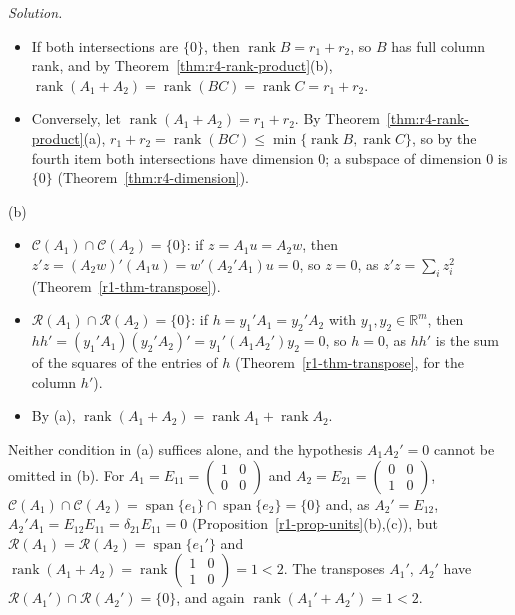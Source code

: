 \documentclass[12pt]{article}
\newcommand{\R}{\mathbb R}
\DeclareMathOperator{\rank}{rank}
\DeclareMathOperator{\Span}{span}
\theoremstyle{definition}
\newenvironment{solution}{\par\noindent\textit{Solution.}\ }{\par\smallskip}
\begin{document}
\begin{solution}
\begin{itemize}
\[
\rank B=r_1+r_2-\dim\bigl(\mathcal C(A_1)\cap\mathcal C(A_2)\bigr),\qquad
\rank C=r_1+r_2-\dim\bigl(\mathcal R(A_1)\cap\mathcal R(A_2)\bigr)
\]
\item If both intersections are \(\{0\}\), then \(\rank B=r_1+r_2\), so \(B\) has full column rank, and by
Theorem~\ref{thm:r4-rank-product}(b), \(\rank(A_1+A_2)=\rank(BC)=\rank C=r_1+r_2\).
\item Conversely, let \(\rank(A_1+A_2)=r_1+r_2\). By Theorem~\ref{thm:r4-rank-product}(a),
\(r_1+r_2=\rank(BC)\leqslant\min\{\rank B,\rank C\}\), so by the fourth item both intersections have dimension \(0\); a
subspace of dimension \(0\) is \(\{0\}\) (Theorem~\ref{thm:r4-dimension}).
\end{itemize}
(b)
\begin{itemize}
\item \(\mathcal C(A_1)\cap\mathcal C(A_2)=\{0\}\): if \(z=A_1u=A_2w\), then \(z'z=(A_2w)'(A_1u)=w'(A_2'A_1)u=0\), so
\(z=0\), as \(z'z=\sum_iz_i^2\) (Theorem~\ref{r1-thm-transpose}).
\item \(\mathcal R(A_1)\cap\mathcal R(A_2)=\{0\}\): if \(h=y_1'A_1=y_2'A_2\) with \(y_1,y_2\in\R^m\), then
\(hh'=(y_1'A_1)(y_2'A_2)'=y_1'(A_1A_2')y_2=0\), so \(h=0\), as \(hh'\) is the sum of the squares of the entries of
\(h\) (Theorem~\ref{r1-thm-transpose}, for the column \(h'\)).
\item By (a), \(\rank(A_1+A_2)=\rank A_1+\rank A_2\).
\end{itemize}
Neither condition in (a) suffices alone, and the hypothesis \(A_1A_2'=0\) cannot be omitted in (b). For
\(A_1=E_{11}=\left(\begin{smallmatrix}1&0\\0&0\end{smallmatrix}\right)\) and
\(A_2=E_{21}=\left(\begin{smallmatrix}0&0\\1&0\end{smallmatrix}\right)\),
\(\mathcal C(A_1)\cap\mathcal C(A_2)=\Span\{e_1\}\cap\Span\{e_2\}=\{0\}\) and, as \(A_2'=E_{12}\),
\(A_2'A_1=E_{12}E_{11}=\delta_{21}E_{11}=0\) (Proposition~\ref{r1-prop-units}(b),(c)), but
\(\mathcal R(A_1)=\mathcal R(A_2)=\Span\{e_1'\}\) and
\(\rank(A_1+A_2)=\rank\left(\begin{smallmatrix}1&0\\1&0\end{smallmatrix}\right)=1<2\). The transposes \(A_1'\), \(A_2'\)
have \(\mathcal R(A_1')\cap\mathcal R(A_2')=\{0\}\), and again \(\rank(A_1'+A_2')=1<2\).
\end{solution}
\end{document}
